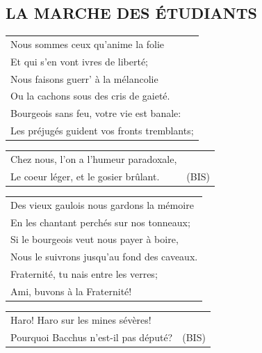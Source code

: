 \documentclass{article}
\begin{document}
\subsection*{LA MARCHE DES ÉTUDIANTS}
\begin{flushleft}
\begin{tabularx}{\textwidth} {
    >{\raggedright\arraybackslash}X}
Nous sommes ceux qu’anime la folie\\
Et qui s’en vont ivres de liberté;\\
Nous faisons guerr’ à la mélancolie\\
Ou la cachons sous des cris de gaieté.\\
Bourgeois sans feu, votre vie est banale:\\
Les préjugés guident vos fronts tremblants;\\
\end{tabularx}
\begin{tabularx}{\textwidth} {
    >{\raggedright\arraybackslash}X|c}
Chez nous, l’on a l’humeur paradoxale, &\\
Le coeur léger, et le gosier brûlant. & (BIS)\\
\end{tabularx}
\end{flushleft}
\begin{flushleft}
\begin{tabularx}{\textwidth} {
    >{\raggedright\arraybackslash}X}
Des vieux gaulois nous gardons la mémoire\\
En les chantant perchés sur nos tonneaux;\\
Si le bourgeois veut nous payer à boire,\\
Nous le suivrons jusqu’au fond des caveaux.\\
Fraternité, tu nais entre les verres;\\
Ami, buvons à la Fraternité!\\
\end{tabularx}
\begin{tabularx}{\textwidth} {
    >{\raggedright\arraybackslash}X|c}
Haro! Haro sur les mines sévères! & \\
Pourquoi Bacchus n’est-il pas député? & (BIS)\\
\end{tabularx}
\end{flushleft}
\end{document}
